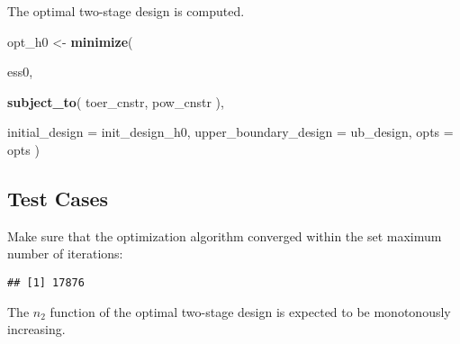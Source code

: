 \documentclass[]{book}
\newenvironment{Shaded}{\begin{snugshade}}{\end{snugshade}}
\newcommand{\DataTypeTok}[1]{\textcolor[rgb]{0.13,0.29,0.53}{#1}}
\newcommand{\DecValTok}[1]{\textcolor[rgb]{0.00,0.00,0.81}{#1}}
\newcommand{\KeywordTok}[1]{\textcolor[rgb]{0.13,0.29,0.53}{\textbf{#1}}}
\newcommand{\NormalTok}[1]{#1}
\newcommand{\OperatorTok}[1]{\textcolor[rgb]{0.81,0.36,0.00}{\textbf{#1}}}
\newcommand{\StringTok}[1]{\textcolor[rgb]{0.31,0.60,0.02}{#1}}
\begin{document}
The optimal two-stage design is computed.

\begin{Shaded}
\begin{Highlighting}[]
\NormalTok{opt_h0 <-}\StringTok{ }\KeywordTok{minimize}\NormalTok{(}
  
\NormalTok{    ess0,}
    
    \KeywordTok{subject_to}\NormalTok{(}
\NormalTok{        toer_cnstr,}
\NormalTok{        pow_cnstr}
\NormalTok{    ),}
    
    \DataTypeTok{initial_design        =}\NormalTok{ init_design_h0,}
    \DataTypeTok{upper_boundary_design =}\NormalTok{ ub_design,}
    \DataTypeTok{opts =}\NormalTok{ opts )}
\end{Highlighting}
\end{Shaded}

\hypertarget{test-cases-1}{%
\subsection{Test Cases}\label{test-cases-1}}

Make sure that the optimization algorithm converged within the set
maximum number of iterations:

\begin{Shaded}
\end{Shaded}

\begin{verbatim}
## [1] 17876
\end{verbatim}

The \(n_2\) function of the optimal two-stage design is expected to be
monotonously increasing.

\begin{Shaded}
\end{Shaded}
\end{document}
